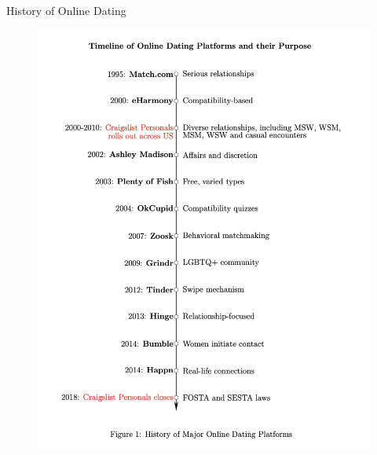 \documentclass{beamer}
\begin{document}
\begin{frame}{History of Online Dating}

\begin{figure}[ht]
    \centering
    \includegraphics[width=\linewidth, height=0.8\textheight, keepaspectratio]{./lecture_includes/onlinedating_timeline.png}
\end{figure}

\end{frame}
\end{document}
